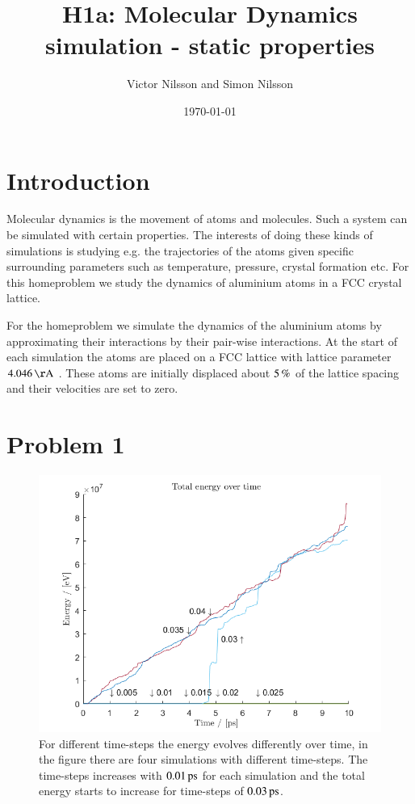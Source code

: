 



\title{H1a: Molecular Dynamics simulation - static properties}
\author{Victor Nilsson and Simon Nilsson}
\date{\today}





\section*{Introduction}

Molecular dynamics is the movement of atoms and molecules. Such a system can be simulated with certain properties. The interests of doing these kinds of simulations is studying e.g. the trajectories of the atoms given specific surrounding parameters such as temperature, pressure, crystal formation etc. For this homeproblem we study the dynamics of aluminium atoms in a FCC crystal lattice.

For the homeproblem we simulate the dynamics of the aluminium atoms by approximating their interactions by their pair-wise interactions. At the start of each simulation the atoms are placed on a FCC lattice with lattice parameter $\unit[4.046]{\AA}$ \cite{al_wiki}. These atoms are initially displaced about $\unit[5]{\%}$ of the lattice spacing and their velocities are set to zero.

\section*{Problem 1}

\begin{figure}[H]
    \centering
    \includegraphics[width=\textwidth]{graphics/task1/energy.png}
    \caption{For different time-steps the energy evolves differently over time, in the figure there are four simulations with different time-steps. The time-steps increases with $\unit[0.01]{ps}$ for each simulation and the total energy starts to increase for time-steps of $\unit[0.03]{ps}$.}
    \label{fig:timestep}
\end{figure}

